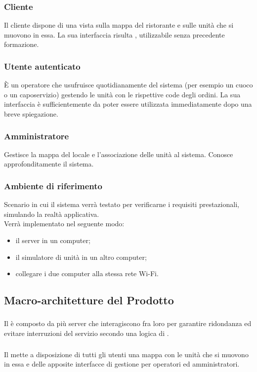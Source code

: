     \subsubsection{Cliente}
    Il cliente dispone di una vista sulla mappa del ristorante e sulle unità che si muovono in essa. La sua interfaccia risulta , utilizzabile senza precedente formazione.

    \subsubsection{Utente autenticato}
    È un operatore che usufruisce quotidianamente del sistema (per esempio un cuoco o un caposervizio) gestendo le unità con le rispettive code degli ordini. La sua interfaccia è sufficientemente  da poter essere utilizzata immediatamente dopo una breve spiegazione.

    \subsubsection{Amministratore}
    Gestisce la mappa del locale e l'associazione delle unità al sistema. Conosce approfonditamente il sistema.
    
    \newpage
    
    \subsubsection{Ambiente di riferimento}
    Scenario in cui il sistema verrà testato per verificarne i requisiti prestazionali, simulando la realtà applicativa.\\
    Verrà implementato nel seguente modo:
    \begin{itemize}
    	\item il  server in un computer;
    	\item il simulatore di unità in un altro computer;
    	\item collegare i due computer alla stessa rete Wi-Fi.	
    \end{itemize}

\subsection{Macro-architetture del Prodotto}
    \subsubsection{}
    Il  è composto da più server che interagiscono fra loro per garantire ridondanza ed evitare interruzioni del servizio secondo una logica di .

    \subsubsection{}
    Il  mette a disposizione di tutti gli utenti una mappa con le unità che si muovono in essa e delle apposite interfacce di gestione per operatori ed amministratori.